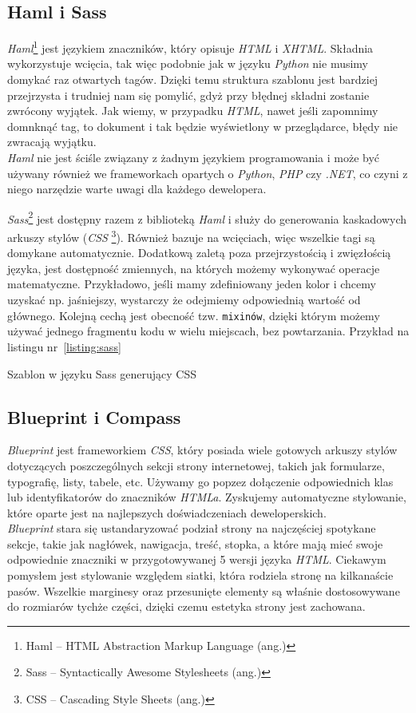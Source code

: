 \documentclass[a4paper,12pt]{article}
\begin{document}
\subsection{Haml i Sass}
\emph{Haml}\footnote{Haml -- HTML Abstraction Markup Language (ang.)} jest językiem
znaczników, który opisuje \emph{HTML} i \emph{XHTML}. Składnia wykorzystuje wcięcia, tak więc podobnie
jak w języku \emph{Python} nie musimy domykać raz otwartych tagów. Dzięki temu struktura
szablonu jest bardziej przejrzysta i trudniej nam się pomylić, gdyż przy błędnej składni
zostanie zwrócony wyjątek. Jak wiemy, w przypadku \emph{HTML}, nawet jeśli zapomnimy
domnknąć tag, to dokument i tak będzie wyświetlony w przeglądarce, błędy nie zwracają
wyjątku.\\
\emph{Haml} nie jest ściśle związany z żadnym językiem programowania i może być używany
również we frameworkach opartych o \emph{Python}, \emph{PHP} czy \emph{.NET}, co czyni
z niego narzędzie warte uwagi dla każdego dewelopera.


\emph{Sass}\footnote{Sass -- Syntactically Awesome Stylesheets (ang.)} jest dostępny razem
z biblioteką \emph{Haml} i służy do generowania kaskadowych arkuszy stylów (\emph{CSS
}\footnote{CSS -- Cascading Style Sheets (ang.)}). Również bazuje na wcięciach, więc
wszelkie tagi są domykane automatycznie. Dodatkową zaletą poza przejrzystością i
zwięzłością języka, jest dostępność zmiennych, na których możemy wykonywać operacje
matematyczne. Przykładowo, jeśli mamy zdefiniowany jeden kolor i chcemy uzyskać np.
jaśniejszy, wystarczy że odejmiemy odpowiednią wartość od głównego. Kolejną cechą jest
obecność tzw. \texttt{mixinów}, dzięki którym możemy używać jednego fragmentu kodu w wielu
miejscach, bez powtarzania. Przykład na listingu nr~\ref{listing:sass}

\begin{listing}
  
  \caption{Szablon w języku Sass generujący CSS}
  \label{listing:sass}
\end{listing}


\subsection{Blueprint i Compass}\label{sec:compass}
\emph{Blueprint} jest frameworkiem \emph{CSS}, który posiada wiele gotowych arkuszy stylów
dotyczących poszczególnych sekcji strony internetowej, takich jak formularze, typografię,
listy, tabele, etc. Używamy go popzez dołączenie odpowiednich klas lub identyfikatorów do
znaczników \emph{HTMLa}. Zyskujemy automatyczne stylowanie, które oparte jest na
najlepszych doświadczeniach deweloperskich.\\
\emph{Blueprint} stara się ustandaryzować podział strony na najczęściej spotykane sekcje,
takie jak nagłówek, nawigacja, treść, stopka, a które mają mieć swoje odpowiednie
znaczniki w przygotowywanej 5 wersji języka \emph{HTML}. Ciekawym pomysłem jest
stylowanie względem siatki, która rodziela stronę na kilkanaście pasów. Wszelkie marginesy
oraz przesunięte elementy są właśnie dostosowywane do rozmiarów tychże części, dzięki czemu
estetyka strony jest zachowana.
\end{document}
